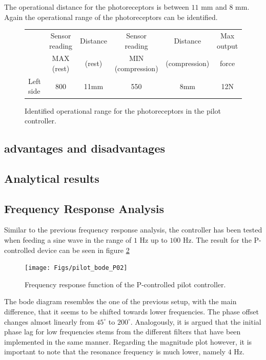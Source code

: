 The operational distance for the photoreceptors is between $11$ mm and $8$ mm. 
Again the operational range of the photoreceptors can be identified.

\begin{figure}[h!]
	\centering
	\begin{tabular}{|l|c|c|c|c|c|}
		\hline
		& Sensor reading & Distance & Sensor reading & Distance & Max output  \\
		& MAX (rest) & (rest) & MIN (compression) & (compression) & force \\ \hline \hline
		Left side & 800 & 11mm & 550 & 8mm & 12N \\ \hline
	\end{tabular}
	\caption{Identified operational range for the photoreceptors in the pilot controller.}
	\label{tab:oper_range_pilot}
\end{figure}
\subsection{advantages and disadvantages}%
\subsection{Analytical results}
\subsection{Frequency Response Analysis}
Similar to the previous frequency response analysis, the controller has been tested when feeding a sine wave in the range of $1$ Hz up to $100$ Hz. The result for the P-controlled device can be seen in figure \ref{fig:pilot_bode_P02}

\begin{figure}[h!]
	\centering
	\texttt{[image: Figs/pilot\_bode\_P02]}
	\caption{Frequency response function of the P-controlled pilot controller.}
	\label{fig:pilot_bode_P02}
\end{figure}

The bode diagram resembles the one of the previous setup, with the main difference, that it seems to be shifted towards lower frequencies. The phase offset changes almost linearly from $45 ^\circ$ to $200 ^\circ$. Analogously, it is argued that the initial phase lag for low frequencies stems from the different filters that have been implemented in the same manner. Regarding the magnitude plot however, it is important to note that the resonance frequency is much lower, namely $4$ Hz.\\

